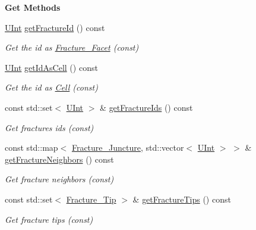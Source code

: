 \begin{Indent}{\bf Get Methods}\par
\begin{DoxyCompactItemize}
\item 
\hyperlink{namespaceFVCode3D_a4bf7e328c75d0fd504050d040ebe9eda}{U\+Int} \hyperlink{classFVCode3D_1_1Rigid__Mesh_1_1Fracture__Facet_ab689ea77aaf2893e90926877be19f96d}{get\+Fracture\+Id} () const 
\begin{DoxyCompactList}\small\item\em Get the id as \hyperlink{classFVCode3D_1_1Rigid__Mesh_1_1Fracture__Facet}{Fracture\+\_\+\+Facet} (const) \end{DoxyCompactList}\item 
\hyperlink{namespaceFVCode3D_a4bf7e328c75d0fd504050d040ebe9eda}{U\+Int} \hyperlink{classFVCode3D_1_1Rigid__Mesh_1_1Fracture__Facet_ac9ae51febe81d2e8dafcbf6d3e1e3437}{get\+Id\+As\+Cell} () const 
\begin{DoxyCompactList}\small\item\em Get the id as \hyperlink{classFVCode3D_1_1Rigid__Mesh_1_1Cell}{Cell} (const) \end{DoxyCompactList}\item 
const std\+::set$<$ \hyperlink{namespaceFVCode3D_a4bf7e328c75d0fd504050d040ebe9eda}{U\+Int} $>$ \& \hyperlink{classFVCode3D_1_1Rigid__Mesh_1_1Fracture__Facet_abb71a1a2cfd3b0cd6e373fe60fb6c50c}{get\+Fracture\+Ids} () const 
\begin{DoxyCompactList}\small\item\em Get fractures ids (const) \end{DoxyCompactList}\item 
const std\+::map$<$ \hyperlink{classFVCode3D_1_1Rigid__Mesh_a7c7beee55763889ef7a4d0bc48392084}{Fracture\+\_\+\+Juncture}, std\+::vector$<$ \hyperlink{namespaceFVCode3D_a4bf7e328c75d0fd504050d040ebe9eda}{U\+Int} $>$ $>$ \& \hyperlink{classFVCode3D_1_1Rigid__Mesh_1_1Fracture__Facet_a8938590c97aba07cb21bb9ba8d64cecd}{get\+Fracture\+Neighbors} () const 
\begin{DoxyCompactList}\small\item\em Get fracture neighbors (const) \end{DoxyCompactList}\item 
const std\+::set$<$ \hyperlink{classFVCode3D_1_1Rigid__Mesh_a114241afca8d7f22e28397e6a59c931f}{Fracture\+\_\+\+Tip} $>$ \& \hyperlink{classFVCode3D_1_1Rigid__Mesh_1_1Fracture__Facet_ac505cd03d98e3ff67c9bf8fdc8b42689}{get\+Fracture\+Tips} () const 
\begin{DoxyCompactList}\small\item\em Get fracture tips (const) \end{DoxyCompactList}\end{DoxyCompactItemize}
\end{Indent}
